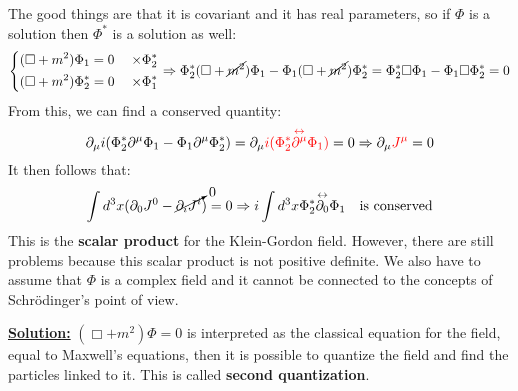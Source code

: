 \documentclass[../main.tex]{subfiles}
\begin{document}
The good things are that it is covariant and it has real parameters, so if $\Phi$ is a solution then $\Phi^*$ is a solution as well:
\[
\left\{
\begin{aligned}
&(\Box+m^2)\Phi_1=0 \; &\times\Phi_2^*\\
&(\Box+m^2)\Phi_2^*=0 \; &\times\Phi_1^*
\end{aligned}
\right.
\Rightarrow \Phi_2^*(\Box+\cancel{m^2})\Phi_1-\Phi_1(\Box+\cancel{m^2})\Phi_2^*=\Phi_2^*\Box\Phi_1-\Phi_1\Box\Phi_2^*=0
\]
From this, we can find a conserved quantity:
\[
\partial_{\mu}i(\Phi_2^*\partial^{\mu}\Phi_1-\Phi_1\partial^{\mu}\Phi_2^*)=\partial_{\mu}{\color{red}i(\Phi_2^*\overset{\leftrightarrow}{\partial^{\mu}}\Phi_1)}=0\Rightarrow\partial_{\mu}{\color{red}J^{\mu}}=0
\]
It then follows that:
\[
\int d^3x(\partial_0J^0-\cancelto{0}{\partial_iJ^i})=0\Rightarrow i\int d^3x\Phi_2^*\overset{\leftrightarrow}{\partial_0}\Phi_1 \quad \text{is conserved}
\]
This is the \textbf{scalar product} for the Klein-Gordon field. However, there are still problems because this scalar product is not positive definite. We also have to assume that $\Phi$ is a complex field and it cannot be connected to the concepts of Schr\"odinger's point of view. 

\underline{\textbf{Solution:}} $(\Box+m^2)\Phi=0$ is interpreted as the classical equation for the field, equal to Maxwell's equations, then it is possible to quantize the field and find the particles linked to it. This is called \textbf{second quantization}.
\end{document}

